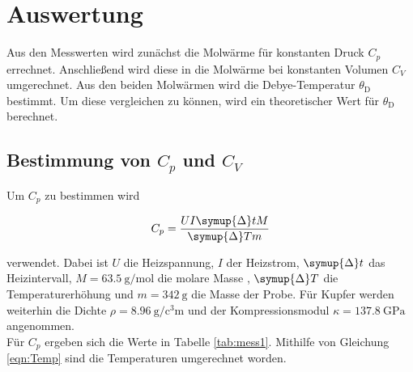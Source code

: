\section{Auswertung}
\label{sec:Auswertung}

Aus den Messwerten wird zunächst die Molwärme für konstanten Druck $C_p$ errechnet. Anschließend wird diese in die Molwärme bei 
konstanten Volumen $C_V$ umgerechnet. Aus den beiden Molwärmen wird die Debye-Temperatur $\theta_\text{D}$ bestimmt. Um diese 
vergleichen zu können, wird ein theoretischer Wert für $\theta_\text{D}$ berechnet. 

\subsection{Bestimmung von $C_p$ und $C_V$}

Um $C_p$ zu bestimmen wird 

\begin{equation*}
    C_p = \frac{U I \symup{\Delta}t M}{\symup{\Delta} T m}
\end{equation*}

verwendet. Dabei ist $U$ die Heizspannung, $I$ der Heizstrom, $\symup{\Delta}t$ das Heizintervall, $M = \SI{63.5}{\gram\per\mole}$ die molare Masse \cite{Molare}, 
$\symup{\Delta}T$ die Temperaturerhöhung und $m = \SI{342}{\gram}$ \cite{Anleitung} die Masse der Probe. Für Kupfer werden weiterhin die Dichte $\rho = \SI{8.96}{\gram\per\cubic\centi\meter}$
\cite{KompDichte} und der Kompressionsmodul $\kappa = \SI{137.8}{\giga\pascal}$ \cite{KompDichte} angenommen.\\

Für $C_p$ ergeben sich die Werte in Tabelle \ref{tab:mess1}. Mithilfe von Gleichung \eqref{eqn:Temp} sind die Temperaturen umgerechnet worden. 

